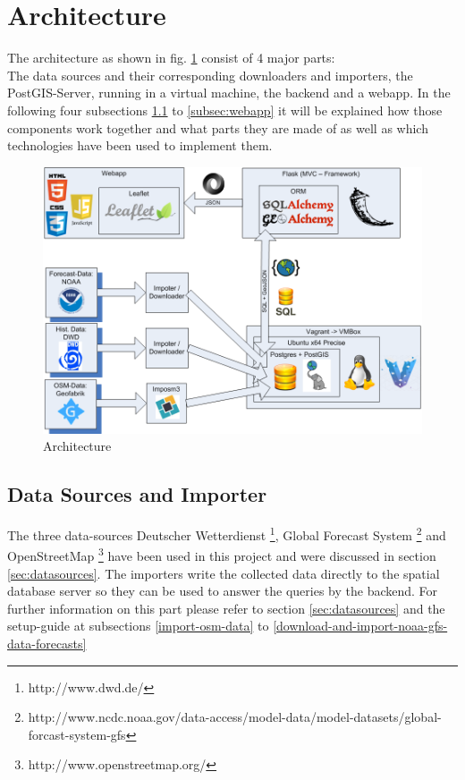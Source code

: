 \documentclass[paper=a4, fontsize=11pt]{article} %
\numberwithin{equation}{section} %
\numberwithin{figure}{section} %
\numberwithin{table}{section} %
\begin{document}
\section{Architecture}
The architecture as shown in fig. \ref{fig:architecture} consist of 4 major parts:\\
The data sources and their corresponding downloaders and importers, the PostGIS-Server, running in a virtual machine, the backend and a webapp. In the following four subsections \ref{subsec:dsai} to \ref{subsec:webapp} it will be  explained how those components work together and what parts they are made of as well as which technologies have been used to implement them.
\begin{figure}[htbp]
\includegraphics[width=1\textwidth]{pictures/Architektur.png}
\caption{Architecture}
\label{fig:architecture}
\end{figure}

\subsection{Data Sources and Importer}\label{subsec:dsai}
The three data-sources Deutscher Wetterdienst \footnote{http://www.dwd.de/}, Global Forecast System \footnote{http://www.ncdc.noaa.gov/data-access/model-data/model-datasets/global-forcast-system-gfs} and OpenStreetMap \footnote{http://www.openstreetmap.org/} have been used in this project and were discussed in section \ref{sec:datasources}. The importers write the collected data directly to the spatial database server so they can be used to answer the queries by the backend. For further information on this part please refer to section \ref{sec:datasources} and the setup-guide at subsections \ref{import-osm-data} to \ref{download-and-import-noaa-gfs-data-forecasts}
\end{document}
